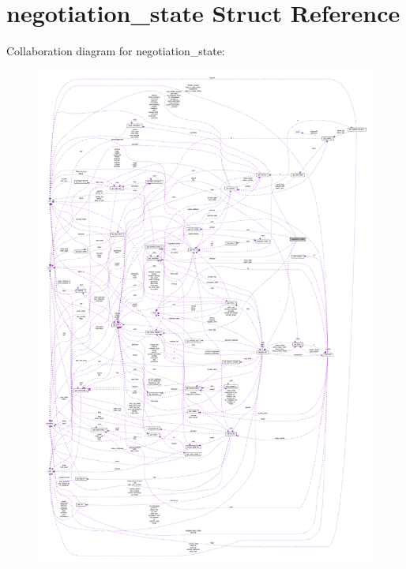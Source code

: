 \hypertarget{structnegotiation__state}{}\section{negotiation\+\_\+state Struct Reference}
\label{structnegotiation__state}


Collaboration diagram for negotiation\+\_\+state\+:
\nopagebreak
\begin{figure}[H]
\begin{center}
\leavevmode
\includegraphics[width=350pt]{structnegotiation__state__coll__graph}
\end{center}
\end{figure}
